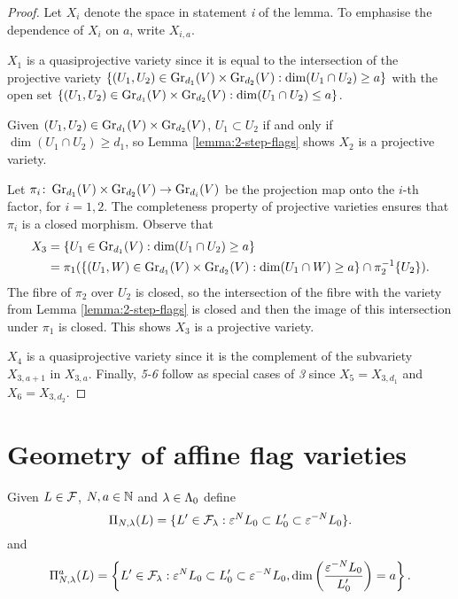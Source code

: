 \documentclass[a4paper, 11pt]{report}
\begin{document}
\begin{proof}
Let $X_i$ denote the space in statement \emph{i} of the lemma. To emphasise the dependence of $X_i$ on $a$, write $X_{i,a}$.

$X_1$ is a quasiprojective variety since it is equal to the intersection of the projective variety $\{(U_1,U_2)\in\GR[d_1]{V}\times\GR[d_2]{V}: \dim(U_1\cap U_2)\geq a\}$ with the open set $\{(U_1,U_2)\in\GR[d_1]{V}\times\GR[d_2]{V}: \dim(U_1\cap U_2)\le a\}$.

Given $(U_1,U_2)\in\GR[d_1]{V}\times\GR[d_2]{V}$, $U_1\subset U_2$ if and only if $\dim(U_1\cap U_2)\geq d_1$, so Lemma \ref{lemma:2-step-flags} shows $X_2$ is a projective variety.

Let $\pi_i\colon\GR[d_1]{V}\times\GR[d_2]{V}\to\GR[d_i]{V}$ be the projection map onto the $i$-th factor, for $i=1,2$. The completeness property of projective varieties ensures that $\pi_i$ is a closed morphism. Observe that
\begin{align*}
X_3 
&= \{U_1\in\GR[d_1]{V}:\dim(U_1\cap U_2)\geq a\}\\
&= \pi_1(\{(U_1,W)\in\GR[d_1]{V}\times\GR[d_2]{V}: \dim(U_1\cap W)\geq a\}\cap\pi_2^{-1}\{U_2\}).
\end{align*}
The fibre of $\pi_2$ over $U_2$ is closed, so the intersection of the fibre with the variety from Lemma \ref{lemma:2-step-flags} is closed and then the image of this intersection under $\pi_1$ is closed. This shows $X_3$ is a projective variety.

$X_4$ is a quasiprojective variety since it is the complement of the subvariety $X_{3,a+1}$ in $X_{3,a}$. Finally, \emph{5-6} follow as special cases of \emph{3} since $X_5 = X_{3,d_1}$ and $X_6 = X_{3,d_2}$.
\end{proof}


\section{Geometry of affine flag varieties}

Given $L\in\flags$, $N,a\in\naturals$ and $\lambda\in\compositions$ define
\begin{equation*}
\Pi_{N,\lambda}(L) = \{L'\in\flags_\lambda: \epsilon^N L_0\subset L_0'\subset \epsilon^{-N}L_0\}.
\end{equation*}
and
\begin{equation*}
\Pi_{N,\lambda}^a(L) = \left\{L'\in\flags_\lambda: \epsilon^N L_0\subset L_0'\subset \epsilon^{-N}L_0, \dim\left(\frac{\epsilon^{-N}L_0}{L_0'}\right) = a\right\}.
\end{equation*}
\end{document}

